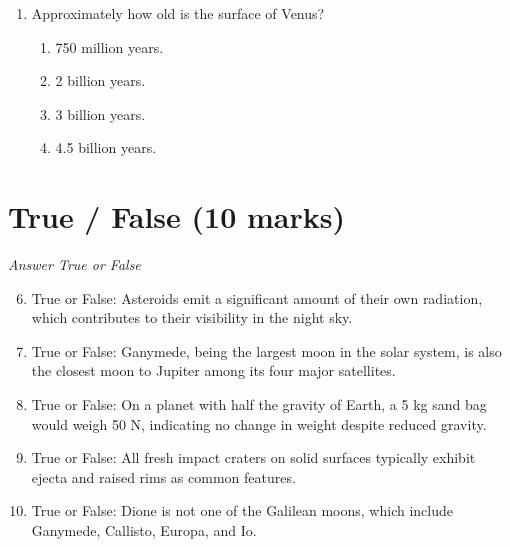 \documentclass[12pt]{article}
\begin{document}
\begin{enumerate}[label=\arabic*.]
\begin{enumerate}[label=(\alph*)]
    \item Distance at which one astronomical unit measures one arcsecond from Earth.
    \item Orbital distance of the solar system around the center of the Milky Way in one year.
    \item Effective distance of the solar wind (i.e. the radius of the heliosphere).
    \item Historical distance to the brightest star Sirius.
\end{enumerate}
\item Approximately how old is the surface of Venus?
\begin{enumerate}[label=(\alph*)]
    \item 750 million years.
    \item 2 billion years.
    \item 3 billion years.
    \item 4.5 billion years.
\end{enumerate}
\end{enumerate}

\section*{True / False (10 marks)}
\textit{Answer True or False}
\begin{enumerate}[label=\arabic*.]
\setcounter{enumi}{5}
\item True or False: Asteroids emit a significant amount of their own radiation, which contributes to their visibility in the night sky.
\item True or False: Ganymede, being the largest moon in the solar system, is also the closest moon to Jupiter among its four major satellites.
\item True or False: On a planet with half the gravity of Earth, a 5 kg sand bag would weigh 50 N, indicating no change in weight despite reduced gravity.
\item True or False: All fresh impact craters on solid surfaces typically exhibit ejecta and raised rims as common features.
\item True or False: Dione is not one of the Galilean moons, which include Ganymede, Callisto, Europa, and Io.
\end{enumerate}
\end{document}
